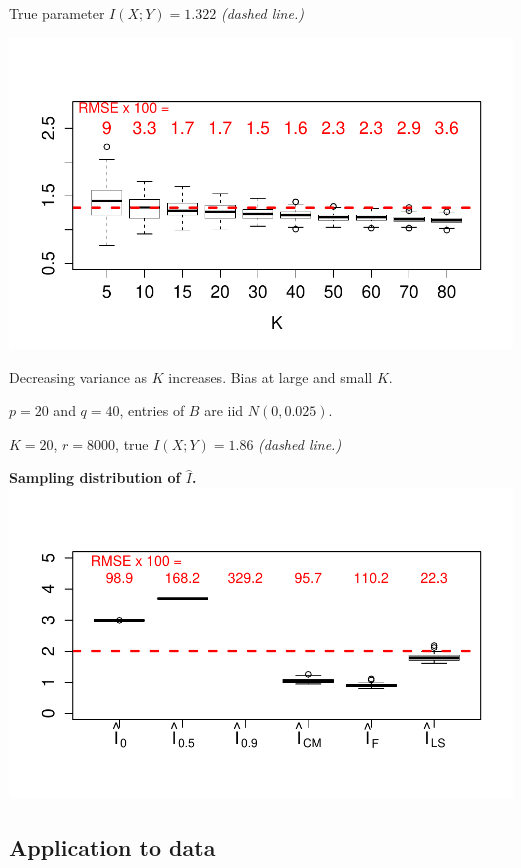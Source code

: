 \documentclass[12pt]{article}
\begin{document}
True parameter $I(X; Y) = 1.322$ \emph{(dashed line.)}
\begin{center}
\includegraphics[scale = 0.6, clip = true, trim = 0 0.5in 0 0.5in]{../info_theory_sims/fig5a.pdf}
\end{center}

Decreasing variance as $K$ increases. Bias at large and small $K$.

$p = 20$ and $q = 40$, entries of $B$ are iid $N(0, 0.025)$.

$K=20$, $r = 8000$, true $I(X; Y) = 1.86$ \emph{(dashed line.)}

\begin{center}
\textbf{Sampling distribution of $\hat{I}$.}
\includegraphics[scale = 0.6, clip = true, trim = 0 0.5in 0 0.5in]{../info_theory_sims/fig6.pdf}
\end{center}

\subsection{Application to data}
\end{document}

